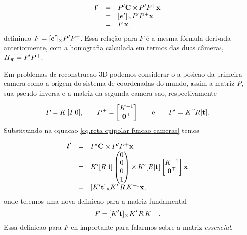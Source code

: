 \begin{equation*}
\begin{array}{rcl}
\boldsymbol{l}'&=&P'{\bf C} \times P'P^+\mathbf{x}\\
&=&[\boldsymbol{e}']_\times P'P^+\mathbf{x}\\
&=&F\,\mathbf{x},
\end{array}
\end{equation*}
definindo $F=[\boldsymbol{e}']_\times P'P^+$. Essa relação para $F$ é a mesma fórmula derivada anteriormente, com a homografia calculada em termos das duas câmeras, $H_{\boldsymbol{\pi}}=P'P^+$.

Em problemas de reconstrucao 3D podemos considerar o a posicao da primeira camera como a origem do sistema de coordenadas do mundo, assim a matriz $P$, sua pseudo-inversa e a matriz da segunda camera sao, respectivamente 

\begin{equation*}
P=K\,[I|0],\qquad
P^+=
\begin{bmatrix}
K^{-1}\\
{\bf 0}^\top
\end{bmatrix}\qquad\text{e}\qquad
P'=K'[R|{\bf t}].
\end{equation*}
Substituindo na equacao \ref{eq.reta-epipolar-funcao-cameras} temos

\begin{equation*}
\begin{array}{rcl}
\boldsymbol{l}'&=&P'{\bf C} \times P'P^+\mathbf{x}\\
&=&K'[R|{\bf t}]
\begin{pmatrix}
0\\
0\\
0\\
1
\end{pmatrix}
\times K'[R|{\bf t}]
\begin{bmatrix}
K^{-1}\\
{\bf 0}^\top
\end{bmatrix}\mathbf{x}\\
&=&
[K'{\bf t}]_\times K'\,R\,K^{-1}\mathbf{x},
\end{array}
\end{equation*}
onde teremos uma nova definicao para a matriz fundamental 
\begin{equation}\label{eq.definicao-F}
F=[K'{\bf t}]_\times K'\,R\,K^{-1}.
\end{equation}
Essa definicao para $F$ eh importante para falarmos sobre a matriz {\it essencial}.


